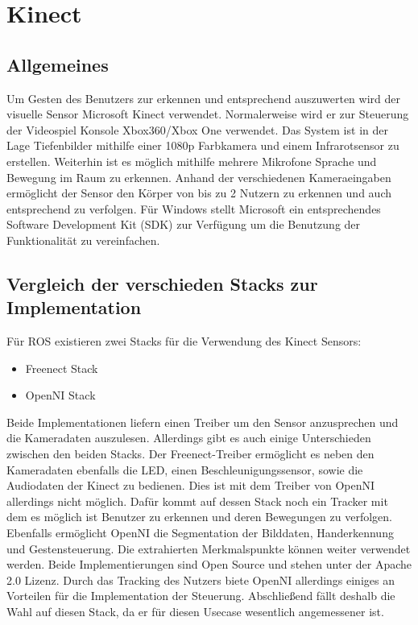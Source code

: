 \section{Kinect}
\subsection{Allgemeines}
Um Gesten des Benutzers zur erkennen und entsprechend auszuwerten wird der visuelle Sensor Microsoft Kinect verwendet. Normalerweise wird er zur Steuerung der Videospiel Konsole Xbox360/Xbox One verwendet. Das System ist in der Lage Tiefenbilder  mithilfe einer 1080p Farbkamera und einem Infrarotsensor zu erstellen. Weiterhin ist es möglich mithilfe mehrere Mikrofone Sprache und Bewegung im Raum zu erkennen. Anhand der verschiedenen Kameraeingaben ermöglicht der Sensor den Körper von bis zu 2 Nutzern zu erkennen und auch entsprechend zu verfolgen. Für Windows stellt Microsoft ein entsprechendes Software Development Kit (SDK) zur Verfügung um die Benutzung der Funktionalität zu vereinfachen.\cite{kinectgolem} \cite{kinectms} \cite{kinectSDK}
\subsection{Vergleich der verschieden Stacks zur Implementation}
Für ROS existieren zwei Stacks für die Verwendung des Kinect Sensors:
\begin{itemize}
	\item Freenect Stack\cite{freenect}
	\item OpenNI Stack\cite{openni}
\end{itemize}
Beide Implementationen liefern einen Treiber um den Sensor anzusprechen und die Kameradaten auszulesen. Allerdings gibt es auch einige Unterschieden zwischen den beiden Stacks. Der Freenect-Treiber ermöglicht es neben den Kameradaten ebenfalls die LED, einen Beschleunigungssensor, sowie die Audiodaten der Kinect zu bedienen.\cite{freenect} Dies ist mit dem Treiber von OpenNI allerdings nicht möglich. Dafür kommt auf dessen Stack noch ein Tracker mit dem es möglich ist Benutzer zu erkennen und deren Bewegungen zu verfolgen. Ebenfalls ermöglicht OpenNI die Segmentation der Bilddaten, Handerkennung und Gestensteuerung. Die extrahierten Merkmalspunkte können weiter verwendet werden. Beide Implementierungen sind Open Source und stehen unter der Apache 2.0 Lizenz\cite{opennilicense}\cite{freenect}. Durch das Tracking des Nutzers biete OpenNI allerdings einiges an Vorteilen für die Implementation der Steuerung. Abschließend fällt deshalb die Wahl auf diesen Stack, da er für diesen Usecase wesentlich angemessener ist.

